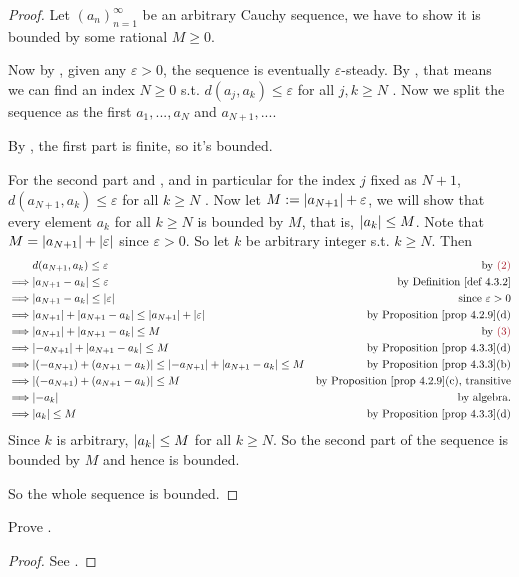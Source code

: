 \begin{proof}
Let \((a_n)_{n = 1}^{\infty}\) be an arbitrary Cauchy sequence, we have to show it is bounded by some rational \(M \ge 0\).

Now by , given any \(\varepsilon > 0\), the sequence is eventually \(\varepsilon\)-steady.
By , that means we can find an index \(N \ge 0\) s.t. \(d(a_j, a_k) \le \varepsilon\) for all \(j, k \ge N\) .
Now we split the sequence as the first \(a_1, ..., a_{N}\) and \(a_{N + 1}, ...\).

By , the first part is finite, so it's bounded.

For the second part and , and in particular for the index \(j\) fixed as \(N + 1\), \(d(a_{N + 1}, a_k) \le \varepsilon\) for all \(k \ge N\) .
Now let \(M := \lvert a_{N + 1}\rvert + \varepsilon\), we will show that every element \(a_k\) for all \(k \ge N\) is bounded by \(M\), that is, \(\lvert a_k\rvert \le M\).
Note that \(M = \lvert a_{N + 1}\rvert + \lvert\varepsilon\rvert\)  since \(\varepsilon > 0\).
So let \(k\) be arbitrary integer s.t. \(k \ge N\).
Then
\begin{align*}
             & d(a_{N + 1}, a_k) \le \varepsilon & \text{by \MAROON{(2)}} \\
    \implies & \abs{a_{N + 1} - a_k} \le \varepsilon & \text{by \DEF{4.3.2}} \\
    \implies & \abs{a_{N + 1} - a_k} \le \abs{\varepsilon} & \text{since \(\varepsilon > 0\)} \\
    \implies & \abs{a_{N + 1}} + \abs{a_{N + 1} - a_k} \le \abs{a_{N + 1}} + \abs{\varepsilon} & \text{by \PROP{4.2.9}(d)} \\
    \implies & \abs{a_{N + 1}} + \abs{a_{N + 1} - a_k} \le M & \text{by \MAROON{(3)}} \\
    \implies & \abs{-a_{N + 1}} + \abs{a_{N + 1} - a_k} \le M & \text{by \PROP{4.3.3}(d)} \\
    \implies & \abs{(-a_{N + 1}) + (a_{N + 1} - a_k)} \le \abs{-a_{N + 1}} + \abs{a_{N + 1} - a_k} \le M & \text{by \PROP{4.3.3}(b)} \\
    \implies & \abs{(-a_{N + 1}) + (a_{N + 1} - a_k)} \le M & \text{by \PROP{4.2.9}(c), transitive} \\
    \implies & \abs{-a_k} & \text{by algebra}. \\
    \implies & \abs{a_k} \le M & \text{by \PROP{4.3.3}(d)}
\end{align*}
Since \(k\) is arbitrary, \(\lvert a_k\rvert \le M\) for all \(k \ge N\).
So the second part of the sequence is bounded by \(M\) and hence is bounded.

So the whole sequence is bounded.
\end{proof}

\begin{exercise} \label{exercise 5.1.1}
Prove .
\end{exercise}

\begin{proof}
See .
\end{proof}